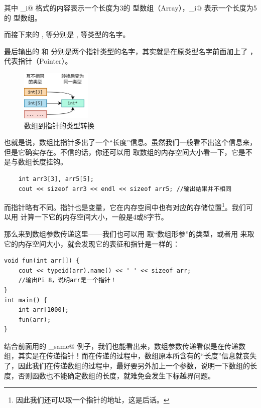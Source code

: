 其中 _i@ 格式的内容表示一个长度为3的 \lstinline@int@ 型数组（Array），_i@ 表示一个长度为5的 \lstinline@int@ 型数组。\par
而接下来的 \lstinline@i@, \lstinline@d@ 等分别是 \lstinline@int@, \lstinline@double@ 等类型的名字。\par
最后输出的 \lstinline@Pi@ 和 \lstinline@Pc@ 分别是两个指针类型的名字，其实就是在原类型名字前面加上了 \lstinline@P@ ，代表指针（Pointer）。\par
\begin{figure}[htbp]
    \centering
    \includegraphics[width=0.3\textwidth]{../images/generalized_parts/05_array_to_pointer_conversion.drawio.png}
    \caption{数组到指针的类型转换}    
\end{figure}
也就是说，数组比指针多出了一个``长度''信息。虽然我们一般看不出这个信息来，但是它确实存在。不信的话，你还可以用 \lstinline@sizeof@ 取数组的内存空间大小看一下，它是不是与数组长度挂钩。
\begin{lstlisting}
    int arr3[3], arr5[5];
    cout << sizeof arr3 << endl << sizeof arr5; //输出结果并不相同
\end{lstlisting}\par
而指针略有不同。指针也是变量，它在内存空间中也有对应的存储位置\footnote{因此我们还可以取一个指针的地址，这是后话。}。我们可以用 \lstinline@sizeof@ 计算一下它的内存空间大小，一般是4或8字节。\par
那么来到数组参数传递这里——我们也可以用 \lstinline@typeid@ 取``数组形参''的类型，或者用 \lstinline@sizeof@ 来取它的内存空间大小，就会发现它的表征和指针是一样的：
\begin{lstlisting}
void fun(int arr[]) {
    cout << typeid(arr).name() << ' ' << sizeof arr;
    //输出Pi 8，说明arr是一个指针！
}
int main() {
    int arr[1000];
    fun(arr);
}
\end{lstlisting}
结合前面用的 \lstinline@is_same@ 例子，我们也能看出来，数组参数传递看似是在传递数组，其实是在传递指针！而在传递的过程中，数组原本所含有的``长度''信息就丧失了，因此我们在传递数组的过程中，最好要另外加上一个参数，说明一下数组的长度，否则函数也不能确定数组的长度，就难免会发生下标越界问题。\par

